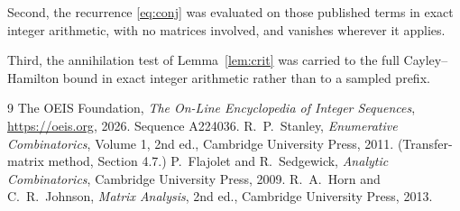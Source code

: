 \documentclass[11pt,a4paper]{article}
\theoremstyle{plain}
\theoremstyle{definition}
\begin{document}
Second, the recurrence \eqref{eq:conj} was evaluated on those published terms in exact
integer arithmetic, with no matrices involved, and vanishes wherever it applies.

Third, the annihilation test of Lemma~\ref{lem:crit} was carried to the full
Cayley--Hamilton bound in exact integer arithmetic rather than to a sampled prefix.

\begin{thebibliography}{9}
 The OEIS Foundation, \emph{The On-Line Encyclopedia of Integer
Sequences}, \url{https://oeis.org}, 2026. Sequence A224036.
 R.~P.~Stanley, \emph{Enumerative Combinatorics}, Volume 1, 2nd ed.,
Cambridge University Press, 2011. (Transfer-matrix method, Section 4.7.)
 P.~Flajolet and R.~Sedgewick, \emph{Analytic Combinatorics}, Cambridge
University Press, 2009.
 R.~A.~Horn and C.~R.~Johnson, \emph{Matrix Analysis}, 2nd ed., Cambridge
University Press, 2013.
\end{thebibliography}
\end{document}
